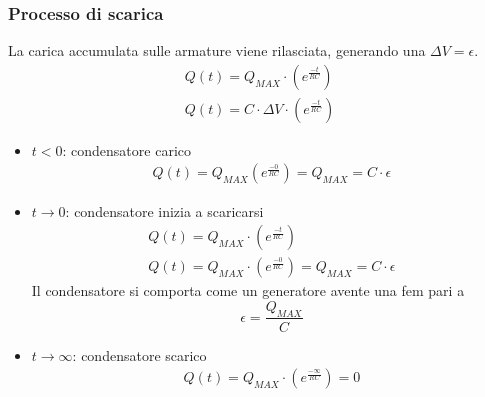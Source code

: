 \subsubsection{Processo di scarica}
La carica accumulata sulle armature viene rilasciata, generando una $\Delta V = \epsilon$.
\begin{displaymath}\begin{aligned}
	Q(t) = Q_{MAX} \cdot (e^{\frac{-t}{RC}})\\
    Q(t) = C \cdot \Delta V \cdot (e^{\frac{-t}{RC}})
\end{aligned}\end{displaymath}
\begin{itemize}
	\item{$t < 0$: condensatore carico
    	\begin{displaymath}\begin{aligned}
    		Q(t) = Q_{MAX} (e^{\frac{-0}{RC}}) = Q_{MAX} = C \cdot \epsilon
    	\end{aligned}\end{displaymath}}
    \item{$t \rightarrow 0$: condensatore inizia a scaricarsi 
    	\begin{displaymath}\begin{aligned}
            Q(t) = Q_{MAX} \cdot (e^{\frac{-t}{RC}})\\
    Q(t) = Q_{MAX} \cdot (e^{\frac{-0}{RC}}) = Q_{MAX} = C \cdot \epsilon
    	\end{aligned}\end{displaymath}
        Il condensatore si comporta come un generatore avente una fem pari a 
        \begin{displaymath}
        	\epsilon = \frac{Q_{MAX}}{C}
        \end{displaymath}}
    \item{$t \rightarrow \infty$: condensatore scarico
      	\begin{displaymath}\begin{aligned}
        	Q(t) = Q_{MAX} \cdot (e^{\frac{-\infty}{RC}}) = 0
         \end{aligned}\end{displaymath}}
\end{itemize}

